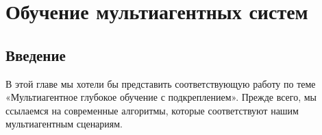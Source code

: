 \chapter{Обучение мультиагентных систем} \label{ch2}

\section{Введение} \label{ch2:intro}

В этой главе мы хотели бы представить соответствующую работу по теме «Мультиагентное глубокое обучение с подкреплением». Прежде всего, мы ссылаемся на современные алгоритмы, которые соответствуют нашим мультиагентным сценариям.


